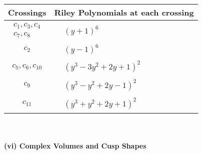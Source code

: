 \documentclass[1p]{elsarticle_modified}
\theoremstyle{definition}
\begin{document}
\begin{tabular}{m{50pt}|m{274pt}}
Crossings & \hspace{64pt}Riley Polynomials at each crossing \\
\hline $$\begin{aligned}c_{1},c_{3},c_{4}\\c_{7},c_{8}\end{aligned}$$&$\begin{aligned}
&(y+1)^6
\end{aligned}$\\
\hline $$\begin{aligned}c_{2}\end{aligned}$$&$\begin{aligned}
&(y-1)^6
\end{aligned}$\\
\hline $$\begin{aligned}c_{5},c_{6},c_{10}\end{aligned}$$&$\begin{aligned}
&(y^3-3 y^2+2 y+1)^2
\end{aligned}$\\
\hline $$\begin{aligned}c_{9}\end{aligned}$$&$\begin{aligned}
&(y^3- y^2+2 y-1)^2
\end{aligned}$\\
\hline $$\begin{aligned}c_{11}\end{aligned}$$&$\begin{aligned}
&(y^3+y^2+2 y+1)^2
\end{aligned}$\\
\hline
\end{tabular}\\~\\
\newpage\flushleft \textbf{(vi) Complex Volumes and Cusp Shapes}
\end{document}
